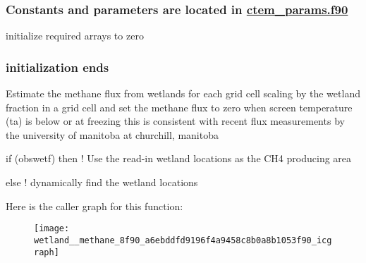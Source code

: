  \subsubsection*{Constants and parameters are located in \hyperlink{ctem__params_8f90}{ctem\+\_\+params.\+f90} }

initialize required arrays to zero

\subsubsection*{initialization ends }

Estimate the methane flux from wetlands for each grid cell scaling by the wetland fraction in a grid cell and set the methane flux to zero when screen temperature (ta) is below or at freezing this is consistent with recent flux measurements by the university of manitoba at churchill, manitoba

if (obswetf) then ! Use the read-\/in wetland locations as the C\+H4 producing area

else ! dynamically find the wetland locations

Here is the caller graph for this function\+:\nopagebreak
\begin{figure}[H]
\begin{center}
\leavevmode
\texttt{[image: wetland\_\_methane\_8f90\_a6ebddfd9196f4a9458c8b0a8b1053f90\_icgraph]}
\end{center}
\end{figure}


